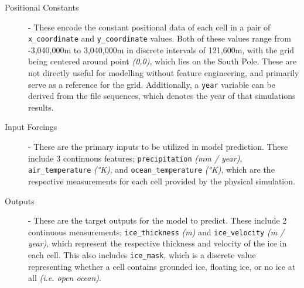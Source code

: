 \begin{description}
  \item[Positional Constants] - These encode the constant positional data of each cell in a pair of  \texttt{x\_coordinate} and \texttt{y\_coordinate} values. Both of these values range from -3,040,000m to 3,040,000m in discrete intervals of 121,600m, with the grid being centered around point \textit{(0,0)}, which lies on the South Pole. These are not directly useful for modelling without feature engineering, and primarily serve as a reference for the grid. Additionally, a \texttt{year} variable can be derived from the file sequences, which denotes the year of that simulations results.

  \item[Input Forcings] - These are the primary inputs to be utilized in model prediction. These include 3 continuous features; \texttt{precipitation} \textit{(mm / year)}, \texttt{air\_temperature} \textit{(°K)}, and \texttt{ocean\_temperature} \textit{(°K)},  which are the respective measurements for each cell provided by the physical simulation. 
    
  \item[Outputs] - These are the target outputs for the model to predict.  These include 2 continuous measurements; \texttt{ice\_thickness} \textit{(m)} and \texttt{ice\_velocity} \textit{(m / year)}, which represent the respective thickness and velocity of the ice in each cell.  This also includes \texttt{ice\_mask}, which is a discrete value representing whether a cell contains grounded ice, floating ice, or no ice at all \textit{(i.e. open ocean)}.
\end{description}
 